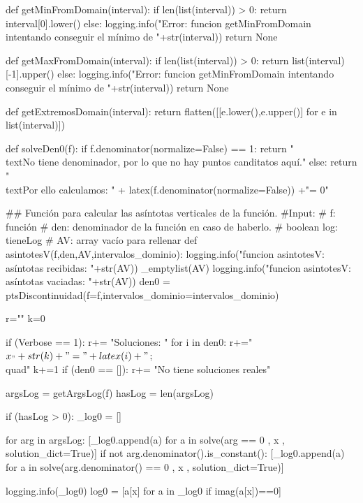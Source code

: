 \begin{sagesilent}
def getMinFromDomain(interval):
    if len(list(interval)) > 0:
        return interval[0].lower()
    else: 
        logging.info("Error:  funcion getMinFromDomain intentando conseguir el mínimo de "+str(interval))
        return None

def getMaxFromDomain(interval):
    if len(list(interval)) > 0:
        return list(interval)[-1].upper()
    else: 
        logging.info("Error:  funcion getMinFromDomain intentando conseguir el mínimo de "+str(interval))
        return None

def getExtremosDomain(interval):
    return flatten([[e.lower(),e.upper()] for e in list(interval)])


def solveDen0(f):
    if f.denominator(normalize=False) == 1:
        return "\\text{No tiene denominador, por lo que no hay puntos canditatos aquí.}"
    else:
        return "\\text{Por ello calculamos:  }" + latex(f.denominator(normalize=False)) +"= 0"


## Función para calcular las asíntotas verticales de la función.
#Input:
# f: función
# den: denominador de la función en caso de haberlo.
# boolean log: tieneLog 
# AV: array vacío para rellenar
def asintotesV(f,den,AV,intervalos_dominio):
    logging.info("funcion asintotesV: asíntotas recibidas: "+str(AV))
    _emptylist(AV)
    logging.info("funcion asintotesV: asíntotas vaciadas: "+str(AV))
    den0 = ptsDiscontinuidad(f=f,intervalos_dominio=intervalos_dominio)

    r=""
    k=0

    if (Verbose == 1):
        r+= "Soluciones: "
        for i in den0:
            r+="$x_"+str(k)+"="+latex(i)+" $;\\quad"
            k+=1
        if (den0 == []):
            r+= "No tiene soluciones reales"


    argsLog = getArgsLog(f)
    hasLog = len(argsLog)


    if (hasLog > 0):
        _log0 = []
        
        for arg in argsLog:
            [_log0.append(a) for a in solve(arg == 0 , x , solution_dict=True)]
            if not arg.denominator().is_constant():
                [_log0.append(a) for a in solve(arg.denominator() == 0 , x , solution_dict=True)]                

        logging.info(_log0)
        log0 = [a[x] for a in _log0 if imag(a[x])==0]  


\end{sagesilent}
